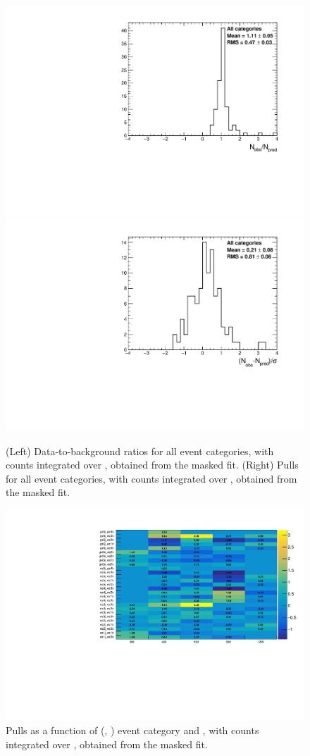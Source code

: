 \begin{figure}[h!]
  \centering
  \caption{(Left) Data-to-background ratios for all event categories,
    with counts integrated over \mht, obtained from the masked
    fit. (Right) Pulls for all event categories, with counts
    integrated over \mht, obtained from the masked fit.}
  \label{fig:ratios_and_pulls}
  \includegraphics[width=0.49\linewidth]{figures/results/36invfb_preapproval/all/ratios_all_prefit.pdf}
  \includegraphics[width=0.49\linewidth]{figures/results/36invfb_preapproval/all/pulls_all_prefit.pdf}
\end{figure}

\begin{figure}[h!]
  \centering
  \caption{Pulls as a function of (\njet, \nb) event category and
    \scalht [GeV], with counts integrated over \mht, obtained from the
    masked fit.}
  \label{fig:pulls}
  \includegraphics[width=0.8\linewidth]{figures/results/36invfb_preapproval/all/pull2D_CROnlyFit.pdf}
\end{figure}

